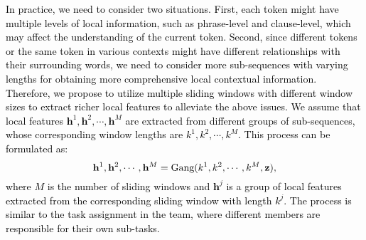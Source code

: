 \documentclass[11pt]{article}
\begin{document}
\textcolor{black}{In practice, we need to consider two situations.
First, each token might have multiple levels of local information, such as phrase-level and clause-level, which may affect the understanding of the current token.
Second, since different tokens or the same token in various contexts might have different relationships with their surrounding words, we need to consider more sub-sequences with varying lengths for obtaining more comprehensive local contextual information.
Therefore, we propose to utilize multiple sliding windows with different window sizes to extract richer local features to alleviate the above issues.
We assume that local features $\mathbf{h}^{1}, \mathbf{h}^{2}, \cdots, \mathbf{h}^{M}$ are extracted from different groups of sub-sequences, whose corresponding window lengths are $k^{1}, k^{2}, \cdots, k^{M}$. This process can be formulated as:
}
\textcolor{black}{
\begin{equation}
\setlength\abovedisplayskip{6pt}
\setlength\belowdisplayskip{6pt}
   \mathbf{h}^{1}, \mathbf{h}^{2}, \cdots, \mathbf{h}^{M} = \text{Gang} (k^{1}, k^{2}, \cdots, k^{M},\mathbf{z}),
\end{equation}
\textcolor{black}{
where $M$ is the number of sliding windows and $\mathbf{h}^{j}$ is a group of local features extracted from the corresponding sliding window with length $k^{j}$. The process is similar to the task assignment in the team, where different members are responsible for their own sub-tasks.
}}
\end{document}
